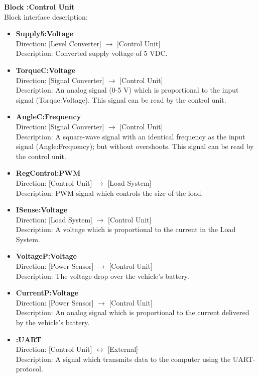 \textbf{Block :Control Unit}\\
Block interface description:
\begin{itemize}
	\item \textbf{Supply5:Voltage}\\
	Direction: [Level Converter] $\rightarrow$ [Control Unit]\\
	Description: Converted supply voltage of 5 VDC.
	\item \textbf{TorqueC:Voltage}\\
	Direction: [Signal Converter] $\rightarrow$ [Control Unit]\\
	Description: An analog signal (0-5 V) which is proportional to the input signal (Torque:Voltage). This signal can be read by the control unit.
	\item \textbf{AngleC:Frequency}\\	
	Direction: [Signal Converter] $\rightarrow$ [Control Unit]\\
	Description: A square-wave signal with an identical frequency as the input signal (Angle:Frequency); but without overshoots. This signal can be read by the control unit.
	\item \textbf{RegControl:PWM}\\
	Direction: [Control Unit] $\rightarrow$ [Load System]\\
	Description: PWM-signal which controls the size of the load.
	\item \textbf{ISense:Voltage}\\
	Direction: [Load System] $\rightarrow$ [Control Unit]\\
	Description: A voltage which is proportional to the current in the Load System.
	\item \textbf{VoltageP:Voltage}\\
	Direction: [Power Sensor] $\rightarrow$ [Control Unit]\\
	Description: The voltage-drop over the vehicle's battery.
	\item \textbf{CurrentP:Voltage}\\
	Direction: [Power Sensor] $\rightarrow$ [Control Unit]\\
	Description: An analog signal which is proportional to the current delivered by the vehicle's battery.
	\item \textbf{:UART}\\
	Direction: [Control Unit] $\leftrightarrow$ [External]\\
	Description: A signal which transmits data to the computer using the UART-protocol.
\end{itemize}